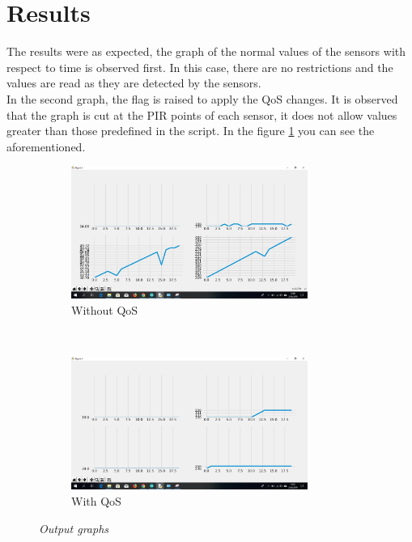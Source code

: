 \documentclass[conference]{IEEEtran}
\begin{document}
\section{Results}
The results were as expected, the graph of the normal values of the sensors with respect to time is observed first. In this case, there are no restrictions and the values are read as they are detected by the sensors.\\
In the second graph, the flag is raised to apply the QoS changes. It is observed that the graph is cut at the PIR points of each sensor, it does not allow values greater than those predefined in the script. In the figure \ref{fig:qos00} you can see the aforementioned.

\begin{figure}[h]
    \begin{subfigure}[h]{0.5\textwidth}
       \centerline{\includegraphics[width=0.85\textwidth]{img/qos.jpeg}}
        \caption{Without QoS}

    \end{subfigure}
    ~ %
     \begin{subfigure}[h]{0.5\textwidth}
        \centerline{\includegraphics[width=0.85\textwidth]{img/qos2.jpeg}}
        \caption{With QoS}

    \end{subfigure}
    \caption{\textit{Output graphs}}
\label{fig:qos00}
\end{figure}
\end{document}
